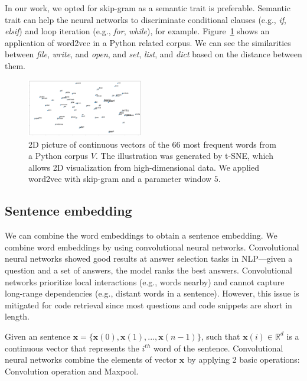 \documentclass[sigconf]{acmart}
\begin{document}
In our work, we opted for skip-gram as a semantic trait is preferable. Semantic trait can help the neural networks to discriminate conditional clauses (e.g., \emph{if}, \emph{elsif}) and loop iteration (e.g., \emph{for}, \emph{while}), for example. Figure~\ref{fig:tsne-code-snippet-python} shows an application of word2vec in a Python related corpus. We can see the similarities between \emph{file}, \emph{write}, and \emph{open}, and \emph{set}, \emph{list}, and \emph{dict} based on the distance between them.

\begin{figure}[h]
\includegraphics[width=0.45\textwidth]{figuras/code_tsne.png}
\caption{2D picture of continuous vectors of the 66 most frequent words from a Python corpus $V$. The illustration was generated by t-SNE, which allows 2D visualization from high-dimensional data. We applied word2vec with skip-gram and a parameter window $5$.}

\label{fig:tsne-code-snippet-python}
\end{figure}

\subsection{Sentence embedding}

We can combine the word embeddings to obtain a sentence embedding. We combine word embeddings by using convolutional neural networks. Convolutional neural networks showed good results at answer selection tasks in NLP---given a question and a set of answers, the model ranks the best answers. Convolutional networks prioritize local interactions (e.g., words nearby) and cannot capture long-range dependencies (e.g., distant words in a sentence). However, this issue is mitigated for code retrieval since most questions and code snippets are short in length.

Given an sentence $\bm{x} = \{ \bm{x}(0), \bm{x}(1), . . ., \bm{x}(n - 1) \}$, such that $\bm{x}(i) \in \mathbb{R}^{d}$ is a continuous vector that represents the $i^{th}$ word of the sentence. Convolutional neural networks combine the elements of vector $\bm{x}$ by applying 2 basic operations: Convolution operation and Maxpool.
\end{document}
